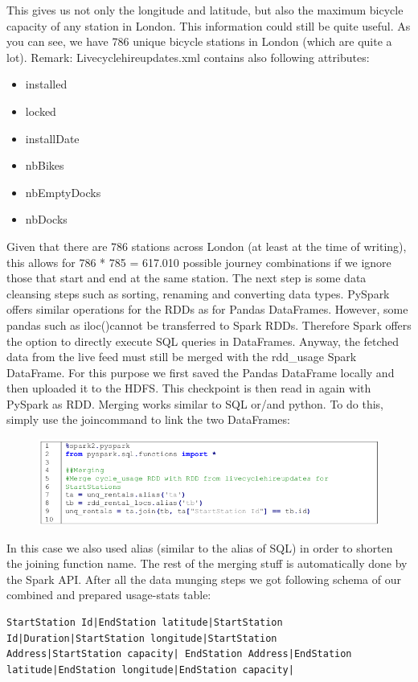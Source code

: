 \documentclass[12pt]{article}
\begin{document}
\noindent This gives us not only the longitude and latitude, but also the maximum bicycle capacity of any station in London. This information could still be quite useful. As you can see, we have 786 unique bicycle stations in London (which are quite a lot).
Remark: Livecyclehireupdates.xml contains also following attributes:
\begin{itemize}
\item installed
\item locked
\item installDate
\item nbBikes
\item nbEmptyDocks
\item nbDocks
\end{itemize}
Given that there are 786 stations across London (at least at the time of writing), this allows for 786 * 785 = 617.010 possible journey combinations if we ignore those that start and end at the same station. The
next step is some data cleansing steps such as sorting, renaming and converting data types. PySpark offers
similar operations for the RDDs as for Pandas DataFrames. However, some pandas such as \glqq iloc()\grqq cannot
be transferred to Spark RDDs. Therefore Spark offers the option to directly execute SQL queries in
DataFrames. Anyway, the fetched data from the live feed must still be merged with the rdd\_usage Spark
DataFrame. For this purpose we first saved the Pandas DataFrame locally and then uploaded it to the
HDFS. This checkpoint is then read in again with PySpark as RDD. Merging works similar to SQL or/and
python. To do this, simply use the \glqq join\grqq command to link the two DataFrames:
\begin{figure}[H]
\hspace{-0.8cm}
\includegraphics[width=1.1\textwidth]{img/spark3}\label{pic:spark3}
\end{figure}
\noindent In this case we also used alias (similar to the alias of SQL) in order to shorten the joining function name. The rest of the merging stuff is automatically done by the Spark API. After all the data
munging steps we got following schema of our combined and prepared usage-stats table:
\begin{lstlisting}[breaklines=true]
StartStation Id|EndStation latitude|StartStation Id|Duration|StartStation longitude|StartStation
Address|StartStation capacity| EndStation Address|EndStation latitude|EndStation longitude|EndStation capacity|
\end{lstlisting}
\end{document}
